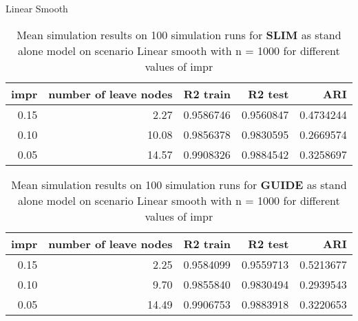 \documentclass[9pt, xcolor=table]{beamer}
\begin{document}
\begin{frame}{Linear Smooth}

\begin{table}
\caption{Mean simulation results on 100 simulation runs for \textbf{SLIM} as stand alone model on scenario Linear smooth with n = 1000 for different values of impr}
\centering \small
\begin{tabular}[t]{r|r|r|r|r}
\hline
impr & number of leave nodes & R2 train & R2 test & ARI\\
\hline
0.15 & 2.27 & 0.9586746 & 0.9560847 & 0.4734244\\
\hline
0.10 & 10.08 & 0.9856378 & 0.9830595 & 0.2669574\\
\hline
0.05 & 14.57 & 0.9908326 & 0.9884542 & 0.3258697\\
\hline
\end{tabular}
\end{table}


\begin{table}

\caption{Mean simulation results on 100 simulation runs for \textbf{GUIDE} as stand alone model on scenario Linear smooth with n = 1000 for different values of impr}
\centering \small
\begin{tabular}[t]{r|r|r|r|r}
\hline
impr & number of leave nodes & R2 train & R2 test & ARI\\
\hline
0.15 & 2.25 & 0.9584099 & 0.9559713 & 0.5213677\\
\hline
0.10 & 9.70 & 0.9855840 & 0.9830494 & 0.2939543\\
\hline
0.05 & 14.49 & 0.9906753 & 0.9883918 & 0.3220653\\
\hline
\end{tabular}
\end{table}
    
\end{frame}
\end{document}
